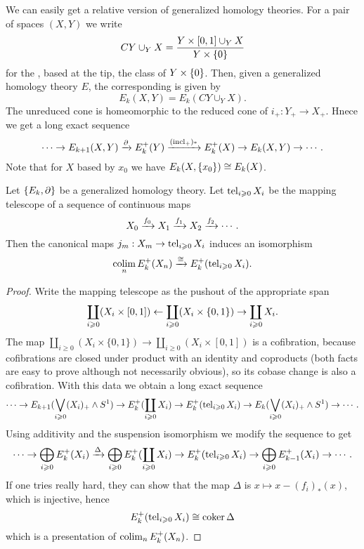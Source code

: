 \begin{remark}
We can easily get a relative version of generalized homology theories. For a pair of spaces $(X,Y)$ we write \[CY\cup_Y X=\frac{Y\times[0,1]\cup_Y X}{Y\times\{0\}}\]
for the , based at the tip, the class of $Y\times\{0\}$. Then, given a generalized homology theory $E$, the corresponding  is given by
\[E_k(X,Y)=E_k(CY\cup_Y X).\]
The unreduced cone is homeomorphic to the reduced cone of $i_+:Y_+\to X_+$. Hnece we get a long exact sequence
\[\cdots\to E_{k+1}(X,Y)\xrightarrow{\partial}E^+_k(Y)\xrightarrow{\operatorname{(incl_+)_*}}E^+_k(X)\to E_k(X,Y)\to\cdots.\]
Note that for $X$ based by $x_0$ we have $E_k(X,\{x_0\})\cong E_k(X)$.
\end{remark}

\begin{proposition}\label{proposition:mapping-telescope-is-homotopy-colimit-generalized}
Let $\{E_k,\partial\}$ be a generalized homology theory. Let $\operatorname{tel}_{i\geqslant0} X_i$ be the mapping telescope of a sequence of continuous maps
\[X_0\xrightarrow{f_0}X_1\xrightarrow{f_1}X_2\xrightarrow{f_2}\cdots.\]
Then the canonical maps $j_m:X_m\to\operatorname{tel}_{i\geqslant0} X_i$ induces an isomorphism
\[\operatorname*{colim}_n E^+_k(X_n)\xrightarrow{\cong}E^+_k(\operatorname{tel}_{i\geqslant0} X_i).\]
\end{proposition}

\begin{proof}
Write the mapping telescope as the pushout of the appropriate span
\[\coprod_{i\geqslant0} (X_i\times[0,1])\leftarrow\coprod_{i\geqslant0} (X_i\times\{0,1\})\to\coprod_{i\geqslant0} X_i.\]
The map $\coprod_{i\ge0} (X_i\times\{0,1\})\to\coprod_{i\ge0} (X_i\times[0,1])$ is a cofibration, because cofibrations are closed under product with an identity and coproducts (both facts are easy to prove although not necessarily obvious), so its cobase change is also a cofibration. With this data we obtain a long exact sequence
\[\cdots\to E_{k+1}(\bigvee_{i\geqslant0}(X_i)_+\wedge S^1)\to E^+_k(\coprod_{i\geqslant0}X_i)\to E^+_k(\operatorname{tel}_{i\geqslant0}X_i)\to E_k(\bigvee_{i\geqslant0}(X_i)_+\wedge S^1)\to\cdots.\]
Using additivity and the suspension isomorphism we modify the sequence to get
\[\cdots\to\bigoplus_{i\geqslant0}E^+_k(X_i)\xrightarrow{\Delta} \bigoplus_{i\geqslant0} E^+_k(\coprod_{i\geqslant0}X_i)\to E^+_k(\operatorname{tel}_{i\geqslant0}X_i)\to\bigoplus_{i\geqslant0}E^+_{k-1}(X_i)\to\cdots.\]
If one tries really hard, they can show that the map $\Delta$ is $x\mapsto x-(f_i)_*(x)$, which is injective, hence
\[E^+_k(\operatorname{tel}_{i\geqslant0}X_i)\cong\operatorname{coker}\Delta\]
which is a presentation of $\operatorname*{colim}_n E^+_k(X_n)$.
\end{proof}

